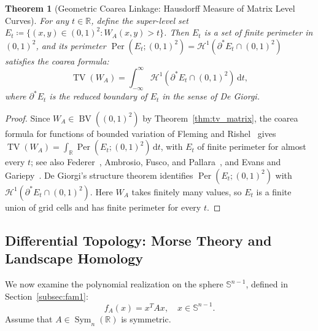\documentclass[11pt,a4paper,reqno]{amsart}
\newtheorem{theorem}{Theorem}[section]
\theoremstyle{definition}
\numberwithin{equation}{section}
\providecommand{\R}{\mathbb{R}}
\providecommand{\Sph}{\mathbb{S}}
\providecommand{\BV}{\operatorname{BV}}
\providecommand{\TV}{\operatorname{TV}}
\newcommand{\Per}{\operatorname{Per}}
\newcommand{\dif}{\,\mathrm{d}}
\begin{document}
\begin{theorem}[Geometric Coarea Linkage: Hausdorff Measure of Matrix Level Curves]
\label{thm:coarea_linkage}
For any $t \in \R$, define the super-level set $E_t \coloneqq \{(x, y) \in (0, 1)^2 \colon W_A(x, y) > t\}$. Then $E_t$ is a set of finite perimeter in $(0, 1)^2$, and its perimeter $\Per(E_t; (0,1)^2) = \mathcal{H}^1(\partial^* E_t \cap (0,1)^2)$ satisfies the \emph{coarea formula}:
\begin{equation}
    \label{eq:coarea}
    \TV(W_A) = \int_{-\infty}^\infty \mathcal{H}^1(\partial^* E_t \cap (0,1)^2) \dif t,
\end{equation}
where $\partial^* E_t$ is the reduced boundary of $E_t$ in the sense of De Giorgi.
\end{theorem}
\begin{proof}
Since $W_A \in \BV((0,1)^2)$ by Theorem~\ref{thm:tv_matrix}, the coarea formula for functions of bounded variation of Fleming and Rishel~\cite{fleming1960integral} gives $\TV(W_A) = \int_{\R} \Per(E_t;(0,1)^2) \dif t$, with $E_t$ of finite perimeter for almost every $t$; see also Federer~\cite{federer1969geometric}, Ambrosio, Fusco, and Pallara~\cite{ambrosio2000functions}, and Evans and Gariepy~\cite{evans2015measure}. De Giorgi's structure theorem identifies $\Per(E_t;(0,1)^2)$ with $\mathcal{H}^1(\partial^* E_t \cap (0,1)^2)$. Here $W_A$ takes finitely many values, so $E_t$ is a finite union of grid cells and has finite perimeter for every $t$.
\end{proof}

\subsection{Differential Topology: Morse Theory and Landscape Homology}
\label{subsec:morse}

We now examine the polynomial realization on the sphere $\Sph^{n-1}$, defined in Section~\ref{subsec:fam1}:
\begin{equation}
    f_A(x) = x^T A x, \quad x \in \Sph^{n-1}.
\end{equation}
Assume that $A \in \operatorname{Sym}_n(\R)$ is symmetric.
\end{document}
